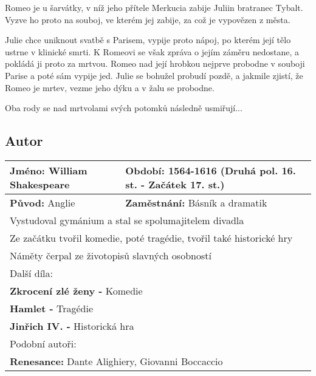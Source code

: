Romeo je u šarvátky, v níž jeho přítele Merkucia zabije Juliin bratranec Tybalt.
Vyzve ho proto na souboj, ve kterém jej zabije, za což je vypovězen z města.

Julie chce uniknout svatbě s Parisem, vypije proto nápoj, po kterém její tělo ustrne v klinické smrti.
K Romeovi se však zpráva o jejím záměru nedostane, a pokládá ji proto za mrtvou.
Romeo nad její hrobkou nejprve probodne v souboji Parise a poté sám vypije jed.
Julie se bohužel probudí pozdě, a jakmile zjistí, že Romeo je mrtev, vezme jeho dýku a v žalu se probodne.

Oba rody se nad mrtvolami svých potomků následně usmiřují...

\subsection*{Autor}
\begin{tabularx}{\linewidth}{l|l}
    \textbf{Jméno:} William Shakespeare & \textbf{Období:} 1564-1616 (Druhá pol. 16. st. - Začátek 17. st.) \\
    \hline
    \textbf{Původ:} Anglie              & \textbf{Zaměstnání:} Básník a dramatik                            \\
    \hline
    \multicolumn{2}{l}{Vystudoval gymánium a stal se spolumajitelem divadla}                                \\
    \multicolumn{2}{l}{Ze začátku tvořil komedie, poté tragédie, tvořil také historické hry}                \\
    \multicolumn{2}{l}{Náměty čerpal ze životopisů slavných osobností}                                      \\
    \hline
    \multicolumn{2}{l}{Další díla:}                                                                         \\
    \multicolumn{2}{l}{\textbf{Zkrocení zlé ženy -} Komedie}                                                \\
    \multicolumn{2}{l}{\textbf{Hamlet -} Tragédie}                                                          \\
    \multicolumn{2}{l}{\textbf{Jinřich IV. -} Historická hra}                                               \\
    \hline
    \multicolumn{2}{l}{Podobní autoři:}                                                                     \\
    \multicolumn{2}{l}{\textbf{Renesance:} Dante Alighiery, Giovanni Boccaccio}                             \\
\end{tabularx}
